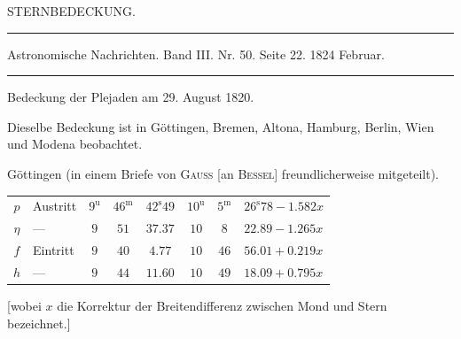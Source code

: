 \clearpage
{}
\hypertarget{native-453-sternbedeckung}{}
\begin{center}
{\large STERNBEDECKUNG.}

\rule{0.75\linewidth}{0.4pt}

Astronomische Nachrichten. Band III. Nr. 50. Seite 22. 1824 Februar.

\rule{0.75\linewidth}{0.4pt}
\end{center}

\begin{center}
Bedeckung der Plejaden am 29. August 1820.
\end{center}

Dieselbe Bedeckung ist in Göttingen, Bremen, Altona, Hamburg, Berlin, Wien und Modena beobachtet.

\begin{center}
Göttingen (in einem Briefe von \textsc{Gauss} [an \textsc{Bessel}] freundlicherweise mitgeteilt).

\begingroup\small\setlength{\tabcolsep}{4pt}
\begin{tabular}{c l c c c | c c l}
$p$ & Austritt & $9^{\mathrm u}$ & $46^{\mathrm m}$ & $42^{\mathrm s}49$ & $10^{\mathrm u}$ & $5^{\mathrm m}$ & $26^{\mathrm s}78 - 1.582x$ \\
$\eta$ & --- & $9$ & $51$ & $37.37$ & $10$ & $8$ & $22.89 - 1.265x$ \\
$f$ & Eintritt & $9$ & $40$ & $4.77$ & $10$ & $46$ & $56.01 + 0.219x$ \\
$h$ & --- & $9$ & $44$ & $11.60$ & $10$ & $49$ & $18.09 + 0.795x$ \\
\end{tabular}
\endgroup
\end{center}

[wobei $x$ die Korrektur der Breitendifferenz zwischen Mond und Stern bezeichnet.]

